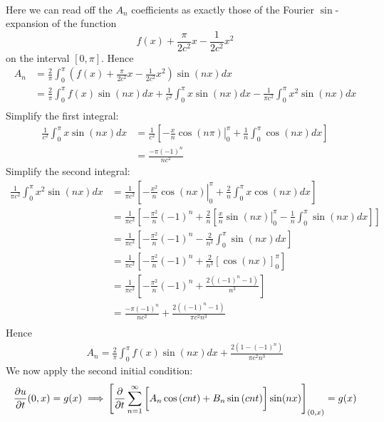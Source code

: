 \documentclass[12pt]{article}
\begin{document}
{\begin{align*}
\end{align*}
Here we can read off the $A_n$ coefficients as exactly those of the Fourier $\sin$-expansion of the function $$ f(x) + \frac{\pi}{2c^2} x - \frac{1}{2c^2} x^2$$ on the interval $[0,\pi]$. Hence 
\begin{align*}
A_n &= \frac{2}{\pi} \int_{0}^{\pi} \left(f(x) +  \frac{\pi}{2c^2} x - \frac{1}{2c^2} x^2 \right) \sin(nx) dx \\
&= \frac{2}{\pi} \int_{0}^{\pi} f(x) \sin(nx) dx + \frac{1}{c^2} \int_0^\pi x\sin(nx)dx - \frac{1}{\pi c^2} \int_0^\pi x^2 \sin(nx) dx \\
\end{align*}
Simplify the first integral:
\begin{align*}
\frac{1}{c^2} \int_0^\pi x\sin(nx)dx &= \frac{1}{c^2} \left[ \left. -\frac{x}{n} \cos(n\pi) \right|_{0}^{\pi} + \frac{1}{n} \int_{0}^{\pi} \cos(nx)dx \right] \\ 
&= \frac{-\pi (-1)^n}{nc^2}
\end{align*}
Simplify the second integral:
\begin{align*}
\frac{1}{\pi c^2} \int_0^\pi x^2 \sin(nx) dx &= \frac{1}{\pi c^2} \left[ \left. -\frac{x^2}{n} \cos(nx) \right|_{0}^{\pi} + \frac{2}{n} \int_0^\pi x \cos(nx) dx \right]  \\
&= \frac{1}{\pi c^2} \left[ -\frac{\pi^2}{n} (-1)^n + \frac{2}{n} \left[ \left. \frac{x}{n} \sin(nx) \right|_{0}^{\pi} - \frac{1}{n} \int_0^\pi \sin(nx) dx \right] \right] \\
&=  \frac{1}{\pi c^2}\left[ -\frac{\pi^2}{n} (-1)^n - \frac{2}{n^2} \int_0^\pi \sin(nx) dx \right] \\
&=  \frac{1}{\pi c^2} \left[ -\frac{\pi^2}{n} (-1)^n + \frac{2}{n^3} \left[ \cos(nx) \right]_{0}^{\pi} \right] \\
&=  \frac{1}{\pi c^2} \left[ -\frac{\pi^2}{n} (-1)^n + \frac{2((-1)^n - 1)}{n^3} \right] \\
&=  \frac{-\pi (-1)^n}{nc^2} + \frac{2((-1)^n - 1)}{\pi c^2 n^3}\\
\end{align*}
Hence 
\begin{align*}
A_n = \frac{2}{\pi} \int_{0}^{\pi} f(x) \sin(nx) dx + \frac{2(1 - (-1)^n)}{\pi c^2 n^3}
\end{align*}
We now apply the second initial condition:
\begin{align*}
\frac{\partial u}{\partial t} (0,x) = g(x) \implies& \left[ \frac{\partial}{\partial t} \sum_{n=1}^{\infty} \left[  \vphantom{\frac{1}{1}} A_n \cos \left( cnt \right) + B_n \sin \left( cnt \right) \right] \sin(nx)  \right]_{(0,x)} = g(x) \\

\end{align*}}
\end{document}
